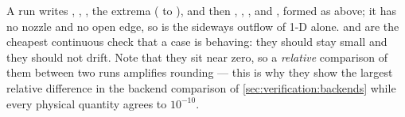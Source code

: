 A  run writes , , , the
extrema ( to ), and then ,
, ,  and
, formed as above; it has no nozzle and no open edge, so
 is the sideways outflow of 1-D alone.
 and  are the cheapest continuous check that a case is behaving: they should
stay small and they should not drift. Note that they sit near zero, so a
\emph{relative} comparison of them between two runs amplifies rounding --- this
is why they show the largest relative difference in the backend comparison of
\cref{sec:verification:backends} while every physical quantity agrees to
$10^{-10}$.

\section{}
\label{sec:output:energy}

